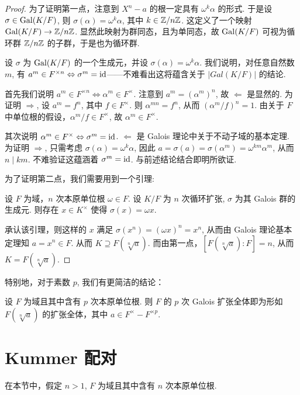 \begin{proof}
  为了证明第一点，注意到 $X^n - a$ 的根一定具有 $\omega^k \alpha$ 的形式.  于是设 $\sigma \in \operatorname{Gal}(K/F)$, 则 $\sigma(\alpha) = \omega^k \alpha$, 其中 $k \in \mathbb Z/n\mathbb Z$.  这定义了一个映射 $\operatorname{Gal}(K/F) \to \mathbb Z/n\mathbb Z$.  显然此映射为群同态，且为单同态，故 $\operatorname{Gal}(K/F)$ 可视为循环群 $\mathbb Z/n\mathbb Z$ 的子群，于是也为循环群.

  设 $\sigma$ 为 $\operatorname{Gal}(K/F)$ 的一个生成元，并设 $\sigma(\alpha) = \omega^k \alpha$.  我们说明，对任意自然数 $m$, 有 $a^m \in F^{\times n} \Leftrightarrow \sigma^m = \operatorname{id}$——不难看出这将蕴含关于 $|Gal(K/F)|$ 的结论.

  首先我们说明 $a^m \in F^{\times n} \Leftrightarrow \alpha^m \in F^\times$.  注意到 $a^m = (\alpha^m)^n$, 故 $\Leftarrow$ 是显然的.  为证明 $\Rightarrow$, 设 $a^m = f^n$, 其中 $f \in F^\times$.  则 $\alpha^{mn} = f^n$, 从而 $(\alpha^m/f)^n = 1$.  由关于 $F$ 中单位根的假设，$\alpha^m/f \in F^\times$, 故 $\alpha^m \in F^\times$.

  其次说明 $\alpha^m \in F^\times \Leftrightarrow \sigma^m = \operatorname{id}$.  $\Leftarrow$ 是 Galois 理论中关于不动子域的基本定理.  为证明 $\Rightarrow$, 只需考虑 $\sigma(\alpha) = \omega^k \alpha$, 因此 $a = \sigma(a) = \sigma(\alpha^m) = \omega^{km} \alpha^m$, 从而 $n \mid km$.  不难验证这蕴涵着 $\sigma^m = \operatorname{id}$.  与前述结论结合即明所欲证.

  为了证明第二点，我们需要用到一个引理:
  \begin{lemma}[Hilbert “定理 90”]
    设 $F$ 为域，$n$ 次本原单位根 $\omega \in F$.  设 $K/F$ 为 $n$ 次循环扩张, $\sigma$ 为其 Galois 群的生成元.  则存在 $x \in K^\times$ 使得 $\sigma(x) = \omega x$.
  \end{lemma}

  承认该引理，则这样的 $x$ 满足 $\sigma(x^n) = (\omega x)^n = x^n$, 从而由 Galois 理论基本定理知 $a = x^n \in F$.  从而 $K \supseteq F(\sqrt[n]{a})$.  而由第一点，$[F(\sqrt[n]{a}) : F] = n$, 从而 $K = F(\sqrt[n]{a})$.
\end{proof}

特别地，对于素数 $p$, 我们有更简洁的结论：
\begin{cor}
  设 $F$ 为域且其中含有 $p$ 次本原单位根.  则 $F$ 的 $p$ 次 Galois 扩张全体即为形如 $F(\sqrt[n]{a})$ 的扩张全体，其中 $a \in F^\times - F^{\times p}$.
\end{cor}

\section{Kummer 配对}
在本节中，假定 $n > 1$, $F$ 为域且其中含有 $n$ 次本原单位根.


